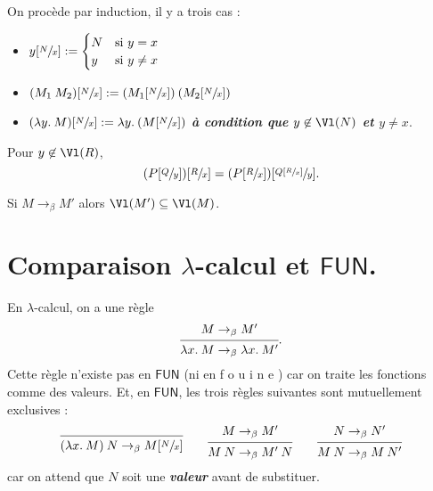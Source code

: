 \documentclass{../notes}
\newcommand\fouine{%
  \textsf{%
  \textcolor{deepblue}  {f}%
  \textcolor{deeppurple}{o}%
  \textcolor{deepblue}  {u}%
  \textcolor{deeppurple}{i}%
  \textcolor{deepblue}  {n}%
  \textcolor{deeppurple}{e}%
  }%
}
\begin{document}
  \begin{defn}
    On procède par induction, il y a trois cas :
    \begin{itemize}
      \item $y[\sfrac{N}{x}] := \begin{cases}
          N &\text{si } y = x\\
          y &\text{si } y \neq x
      \end{cases}$
    \item $(M_1 \: M_2)[\sfrac{N}{x}] := (M_1[\sfrac{N}{x}]) \: (M_2[\sfrac{N}{x}])$
    \item $(\lambda y. \: M)[\sfrac{N}{x}] := \lambda y. \: (M[\sfrac{N}{x}])$  \textit{\textbf{à condition que $y \not\in \Vl(N)$ et $y \neq x$}}.
    \end{itemize}
  \end{defn}

  \begin{lem}
    Pour $y \not\in \Vl(R)$, \[
      (P[\sfrac{Q}{y}])[\sfrac{R}{x}] =
      (P[\sfrac{R}{x}])[\sfrac{Q[\sfrac{R}{x}]}{y}]
    .\] 
  \end{lem}

  \begin{lem}
    Si $M \to_\beta M'$ alors $\Vl(M') \subseteq \Vl(M)$.
  \end{lem}

  \section{Comparaison $\lambda$-calcul et $\mathsf{FUN}$.}

  En $\lambda$-calcul, on a une règle 
  \[
    \begin{prooftree}
      \hypo{M \to_\beta M'}
      \infer 1{\lambda x.\: M \to_\beta \lambda x.\: M'}
    \end{prooftree}
  .\] 
  Cette règle n'existe pas en $\mathsf{FUN}$ (ni en \fouine) car on traite les fonctions comme des valeurs.
  Et, en $\mathsf{FUN}$, les trois règles suivantes sont mutuellement exclusives :
  \begin{gather*}
    \begin{prooftree}
      \infer 0{(\lambda x.\: M)\: N \to_\beta M[\sfrac{N}{x}]}
    \end{prooftree}
    \quad\quad
    \begin{prooftree}
      \hypo{M \to_\beta M'}
      \infer 1{M \: N \to_\beta M' \: N}
    \end{prooftree}
    \quad\quad
    \begin{prooftree}
      \hypo{N \to_\beta N'}
      \infer 1{M \: N \to_\beta M \: N'}
    \end{prooftree}
  \end{gather*}
  car on attend que $N$ soit une \textit{\textbf{valeur}} avant de substituer.
\end{document}
